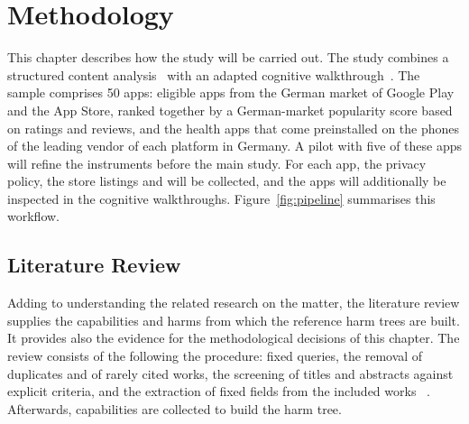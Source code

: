 \chapter{Methodology}
\label{ch:methodology}


This chapter describes how the study will be carried out. The study combines
a structured content analysis~\parencite{krippendorff2019content} with an
adapted cognitive walkthrough~\parencite{wharton1994cognitive}. The sample comprises 50
apps: eligible apps from the German market of Google Play and the App Store,
ranked together by a German-market popularity score based on ratings and reviews, and the health apps that
come preinstalled on the phones of the leading vendor of each platform in Germany. A pilot
with five of these apps will refine the instruments before the main study.
For each app, the privacy policy, the store listings and  will be collected, and the apps will additionally be inspected in the cognitive walkthroughs.  Figure~\ref{fig:pipeline} summarises this workflow.

\section{Literature Review}
\label{sec:lit-review}
Adding to understanding the related research on the matter, the literature review
supplies the capabilities and harms from which the reference harm trees are
built. It provides also the evidence for the methodological decisions of this
chapter. The review consists of the following the procedure:
fixed queries, the removal of duplicates and of rarely cited works, the
screening of titles and abstracts against explicit criteria, and the extraction
of fixed fields from the included works ~\parencite[App.~A, pp.~56--57]{baumann2025llm}. Afterwards, capabilities are collected to build the harm tree.

